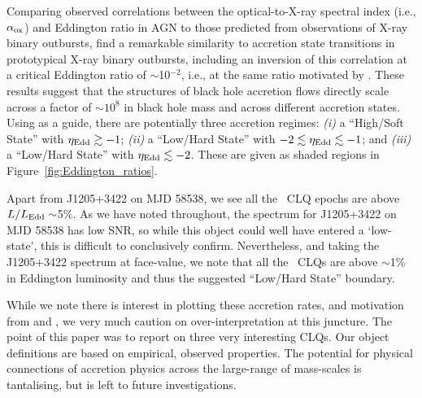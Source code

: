 \documentclass[fleqn,usenatbib]{mnras}
\begin{document}
Comparing observed correlations between the optical-to-X-ray spectral
index (i.e., $\alpha_{\rm ox}$) and Eddington ratio in AGN to those
predicted from observations of X-ray binary outbursts,
\citet{Ruan2019a} find a remarkable similarity to accretion state
transitions in prototypical X-ray binary outbursts, including an
inversion of this correlation at a critical Eddington ratio of
$\sim$10$^{-2}$, i.e., at the same ratio motivated by
\citet{NodaDone2018}.  These results suggest that the structures of
black hole accretion flows directly scale across a factor of
$\sim10^{8}$ in black hole mass and across different accretion
states. Using \citet{Ruan2019a} as a guide, there are potentially
three accretion regimes: {\it (i)} a ``High/Soft State'' with
$\eta_{\rm Edd} \gtrsim -1$; {\it (ii)} a ``Low/Hard State'' with $-2
\lesssim \eta_{\rm Edd} \lesssim -1$; and {\it (iii)} a ``Low/Hard
State'' with $\eta_{\rm Edd} \lesssim -2$.  These are given as shaded
regions in Figure~\ref{fig:Eddington_ratios}.

Apart from J1205+3422 on MJD 58538, we see all the \civ\ CLQ epochs
are above $L / L_{\rm Edd} \sim$5\%. As we have noted throughout, the
spectrum for J1205+3422 on MJD 58538 has low SNR, so while this object
could well have entered a `low-state', this is difficult to
conclusively confirm.  Nevertheless, and taking the J1205+3422
spectrum at face-value, we note that all the \civ\ CLQs are above
$\sim$1\% in Eddington luminosity and thus the suggested ``Low/Hard
State'' boundary.

While we note there is interest in plotting these accretion rates, and
motivation from \citet{NodaDone2018} and \citet{Ruan2019a}, we very
much caution on over-interpretation at this juncture. The point of
this paper was to report on three very interesting CLQs.  Our object
definitions are based on empirical, observed properties.  The
potential for physical connections of accretion physics across the
large-range of mass-scales is tantalising, but is left to future
investigations.



\end{document}
